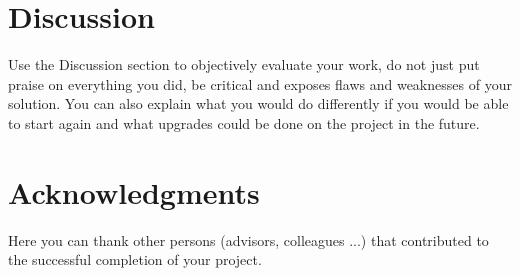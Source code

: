 \documentclass[fleqn,moreauthors,10pt]{ds_report}
\begin{document}

\section*{Discussion}

Use the Discussion section to objectively evaluate your work, do not just put praise on everything you did, be critical and exposes flaws and weaknesses of your solution. You can also explain what you would do differently if you would be able to start again and what upgrades could be done on the project in the future.



\section*{Acknowledgments}

Here you can thank other persons (advisors, colleagues ...) that contributed to the successful completion of your project.




\end{document}
